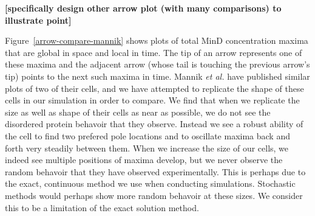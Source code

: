 \documentclass[letterpaper,twocolumn,amsmath,amssymb,pre]{revtex4-1}
\newcommand{\red}[1]{{\bf \color{red} #1}}
\newcommand{\fixme}[1]{\red{[#1]}}
\begin{document}
\fixme{specifically design other arrow plot (with many comparisons) to
  illustrate point}


Figure~\ref{arrow-compare-mannik} shows plots of total MinD
concentration maxima that are global in space and local in time.  The
tip of an arrow represents one of these maxima and the adjacent arrow
(whose tail is touching the previous arrow's tip) points to the next
such maxima in time.  Mannik \emph{et al.} have published similar
plots of two of their cells, and we have attempted to replicate the
shape of these cells in our simulation in order to compare.  We find
that when we replicate the size as well as shape of their cells as
near as possible, we do not see the disordered protein behavoir that
they observe.  Instead we see a robust ability of the cell to find two
prefered pole locations and to oscillate maxima back and forth very
steadily between them.  When we increase the size of our cells, we
indeed see multiple positions of maxima develop, but we never observe
the random behavoir that they have observed experimentally.  This is
perhaps due to the exact, continuous method we use when conducting
simulations.  Stochastic methods would perhaps show more random
behavoir at these sizes.  We consider this to be a limitation of the
exact solution method.


\end{document}
